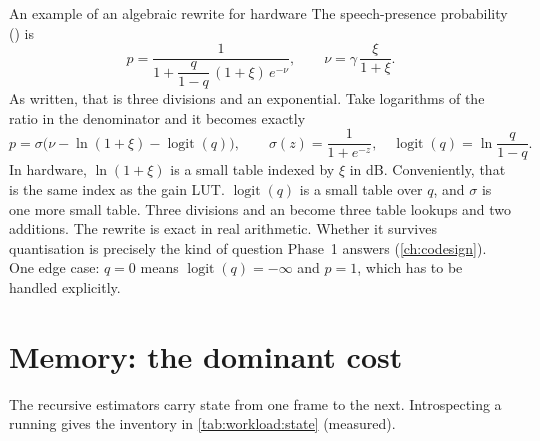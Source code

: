 \begin{conceptbox}{An example of an algebraic rewrite for hardware}
The speech-presence probability () is
\begin{equation}
  p = \frac{1}{1+\dfrac{q}{1-q}\,(1+\xi)\,e^{-\nu}},
  \qquad \nu = \gamma\,\frac{\xi}{1+\xi}.
\end{equation}
As written, that is three divisions and an exponential. Take logarithms of the
ratio in the denominator and it becomes exactly
\begin{equation}
  p = \sigma\!\Big(\nu - \ln(1+\xi) - \operatorname{logit}(q)\Big),
  \qquad \sigma(z)=\frac{1}{1+e^{-z}},\quad
  \operatorname{logit}(q) = \ln\frac{q}{1-q}.
  \label{eq:workload:sigmoid}
\end{equation}
In hardware, $\ln(1+\xi)$ is a small table indexed by $\xi$ in dB. Conveniently,
that is the same index as the gain LUT. $\operatorname{logit}(q)$ is a small
table over $q$, and $\sigma$ is one more small table. Three divisions and an
 become three table lookups and two additions. The rewrite is exact in
real arithmetic. Whether it survives quantisation is precisely the kind of
question Phase~1 answers (\cref{ch:codesign}). One edge case: $q=0$ means
$\operatorname{logit}(q)=-\infty$ and $p=1$, which has to be handled explicitly.
\end{conceptbox}

\section{Memory: the dominant cost}\label{sec:workload:memory}

The recursive estimators carry state from one frame to the next. Introspecting
a running  gives the inventory in
\cref{tab:workload:state} (measured).

